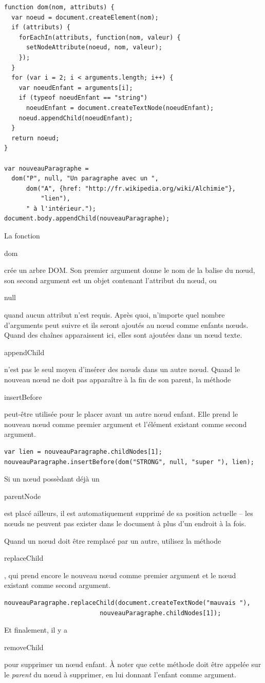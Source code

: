\documentclass{FramateX}
\renewcommand{\texttt}[1]{\begin{sffamily}{#1}\end{sffamily}}
\begin{document}
\begin{lstlisting}
function dom(nom, attributs) {
  var noeud = document.createElement(nom);
  if (attributs) {
    forEachIn(attributs, function(nom, valeur) {
      setNodeAttribute(noeud, nom, valeur);
    });
  }
  for (var i = 2; i < arguments.length; i++) {
    var noeudEnfant = arguments[i];
    if (typeof noeudEnfant == "string")
      noeudEnfant = document.createTextNode(noeudEnfant);
    noeud.appendChild(noeudEnfant);
  }
  return noeud;
}

var nouveauParagraphe =
  dom("P", null, "Un paragraphe avec un ",
      dom("A", {href: "http://fr.wikipedia.org/wiki/Alchimie"},
          "lien"),
      " à l'intérieur.");
document.body.appendChild(nouveauParagraphe);
\end{lstlisting}
La fonction \texttt{dom} crée un arbre DOM. Son premier argument donne
le nom de la balise du nœud, son second argument est un objet contenant
l'attribut du nœud, ou \texttt{null} quand aucun attribut n'est requis.
Après quoi, n'importe quel nombre d'arguments peut suivre et ils seront
ajoutés au nœud comme enfants nœuds. Quand des chaînes apparaissent ici,
elles sont ajoutées dans un nœud texte.

\begin{center}\end{center}

\texttt{appendChild} n'est pas le seul moyen d'insérer des nœuds dans un
autre nœud. Quand le nouveau nœud ne doit pas apparaître à la fin de son
parent, la méthode \texttt{insertBefore} peut-être utilisée pour le
placer avant un autre nœud enfant. Elle prend le nouveau nœud comme
premier argument et l'élément existant comme second argument.

\begin{lstlisting}
var lien = nouveauParagraphe.childNodes[1];
nouveauParagraphe.insertBefore(dom("STRONG", null, "super "), lien);
\end{lstlisting}
Si un nœud possèdant déjà un \texttt{parentNode} est placé ailleurs, il
est automatiquement supprimé de sa position actuelle -- les nœuds ne
peuvent pas exister dans le document à plus d'un endroit à la fois.

Quand un nœud doit être remplacé par un autre, utilisez la méthode
\texttt{replaceChild}, qui prend encore le nouveau nœud comme premier
argument et le nœud existant comme second argument.

\begin{lstlisting}
nouveauParagraphe.replaceChild(document.createTextNode("mauvais "),
                          nouveauParagraphe.childNodes[1]);
\end{lstlisting}
Et finalement, il y a \texttt{removeChild} pour supprimer un nœud
enfant. À noter que cette méthode doit être appelée sur le \emph{parent}
du nœud à supprimer, en lui donnant l'enfant comme argument.
\end{document}

